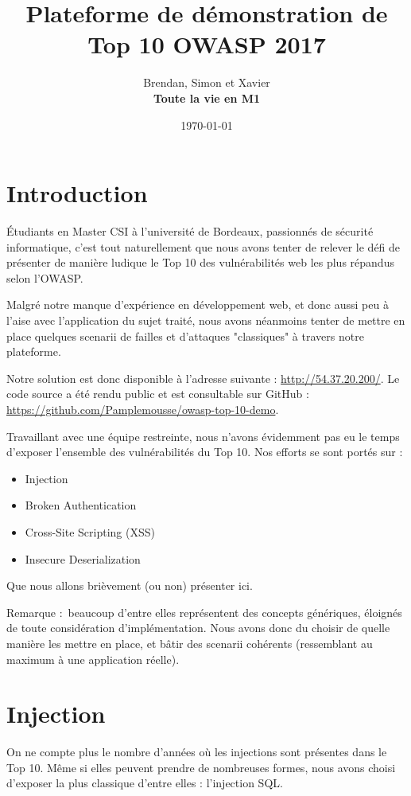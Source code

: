 \documentclass[a4paper,12pt]{article}
\title{Plateforme de démonstration de Top 10 OWASP 2017}
\author{Brendan, Simon et Xavier \\ \textbf{Toute la vie en M1}}
\date{\today}
\begin{document}
\lstset{language=Python, breaklines=true}

\maketitle

\section{Introduction}
Étudiants en Master CSI à l'université de Bordeaux, passionnés de sécurité informatique, c'est tout naturellement que nous avons tenter de relever le défi de présenter de manière ludique le Top 10 des vulnérabilités web les plus répandus selon l'OWASP.

Malgré notre manque d'expérience en développement web, et donc aussi peu à l'aise avec l'application du sujet traité, nous avons néanmoins tenter de mettre en place quelques scenarii de failles et d'attaques "classiques" à travers notre plateforme.

Notre solution est donc disponible à l'adresse suivante : \url{http://54.37.20.200/}.
Le code source a été rendu public et est consultable sur GitHub : \url{https://github.com/Pamplemousse/owasp-top-10-demo}.

Travaillant avec une équipe restreinte, nous n'avons évidemment pas eu le temps d'exposer l'ensemble des vulnérabilités du Top 10. Nos efforts se sont portés sur :
\begin{itemize}
  \item Injection
  \item Broken Authentication
  \item Cross-Site Scripting (XSS)
  \item Insecure Deserialization
\end{itemize}

Que nous allons brièvement (ou non) présenter ici.

Remarque : beaucoup d'entre elles représentent des concepts génériques, éloignés de toute considération d'implémentation. Nous avons donc du choisir de quelle manière les mettre en place, et bâtir des scenarii cohérents (ressemblant au maximum à une application réelle).


\section{Injection}
On ne compte plus le nombre d'années où les injections sont présentes dans le Top 10. Même si elles peuvent prendre de nombreuses formes, nous avons choisi d'exposer la plus classique d'entre elles : l'injection SQL.
\end{document}
